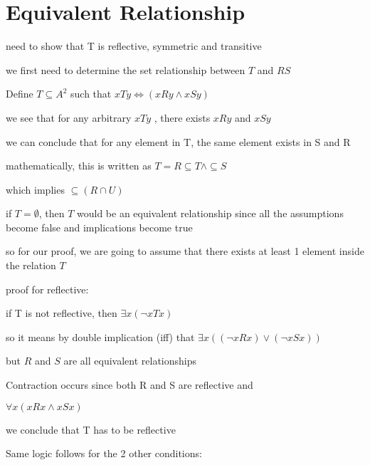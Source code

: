 \documentclass[12pts,A4]{article}
\begin{document}
\section{Equivalent Relationship}

\begin{flushleft}

    need to show that T is reflective, symmetric and transitive
    

    \bigskip
    \bigskip

    we first need to determine the set relationship between $T$ and $R S$
    
    Define $T \subseteq A^{2}$ such that $xTy \iff (xRy \wedge xSy)$

    we see that for any arbitrary $xTy$ , there exists $xRy$ and $xSy$

    we can conclude that for any element in T, the same element exists in S and R

    mathematically, this is written as $T = R \subseteq T \wedge \subseteq S$
    
    which implies $\subseteq ( R \cap U)$ 
    \bigskip
    

    

    if $ T = \emptyset $, then $T$ would be an equivalent relationship since all the assumptions become false and implications become true
    
    so for our proof, we are going to assume that there exists at least 1 element inside the relation $T$

    
    \bigskip

    proof for reflective:
    
    \bigskip

    if T is not reflective, then $ \exists x   (\neg x T x) $

    so it means by double implication (iff) that $ \exists x( (\neg xRx)
    \vee (\neg xSx)) $

    

    but $R$ and $S$ are all equivalent relationships 

    Contraction occurs since both R and S are reflective and 

    $\forall x( xRx \wedge xSx)$

    we conclude that T has to be reflective

    \bigskip


    Same logic follows for the 2 other conditions:

    \bigskip


\end{flushleft}
\end{document}
